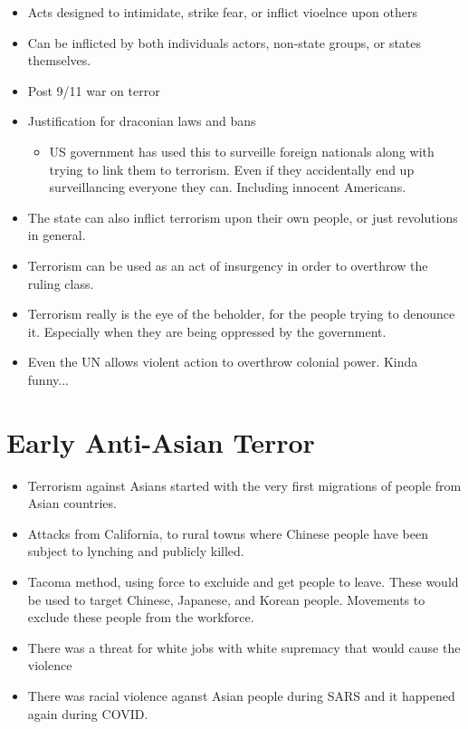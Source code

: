 \documentclass{article}
\begin{document}
\begin{itemize}
  \item Acts designed to intimidate, strike fear, or inflict vioelnce upon others
  \item Can be inflicted by both individuals actors, non-state groups, or states themselves.
  \item Post 9/11 war on terror
  \item Justification for draconian laws and bans
    \begin{itemize}
      \item US government has used this to surveille foreign nationals
        along with trying to link them to terrorism. Even if they accidentally end up
        surveillancing everyone they can. Including innocent Americans.
    \end{itemize}
  \item The state can also inflict terrorism upon their own people, or just revolutions in general.
  \item Terrorism can be used as an act of insurgency in order to overthrow the ruling
    class.
  \item Terrorism really is the eye of the beholder, for the people trying to denounce it.
    Especially when they are being oppressed by the government.
  \item Even the UN allows violent action to overthrow colonial power. Kinda funny...
\end{itemize}

\section{Early Anti-Asian Terror}

\begin{itemize}
  \item Terrorism against Asians started with the very first migrations of people
    from Asian countries.
  \item Attacks from California, to rural towns where Chinese people have been subject to
    lynching and publicly killed.
  \item Tacoma method, using force to excluide and get people to leave. These would be used
    to target Chinese, Japanese, and Korean people. Movements to exclude these people
    from the workforce.
  \item There was a threat for white jobs with white supremacy that would cause the violence
  \item There was racial violence aganst Asian people during SARS and it happened
    again during COVID.
\end{itemize}
\end{document}
